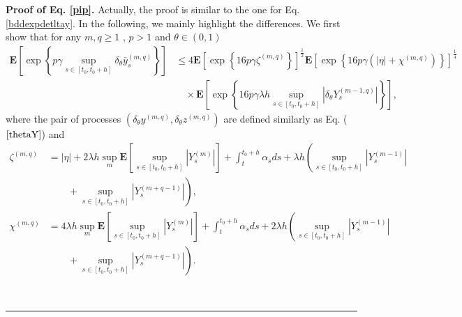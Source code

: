 \documentclass[10pt]{article}%
\numberwithin{equation}{section}
\newenvironment{proof}[1][Proof]{\noindent \textbf{#1.} }{\  \rule{0.5em}{0.5em}}
\begin{document}
\begin{proof}[Proof of Eq. \eqref{pip}]
 Actually, the proof is similar to the one for Eq. \eqref{bddexpdetltay}. In the following, we mainly highlight the differences. We first show that for any $m,q \geq 1$ , $p>1$ and $\theta\in\left(0,1\right)$
$$
\begin{aligned}
\mathbf{E} \left[\exp\left\{p\gamma\sup_{s\in[t_0,t_0+h]}\delta_{\theta}\bar{y}_s^{(m,q)}\right\}\right]&\leq4\mathbf{E}\left[\exp\left\{16p\gamma\zeta^{(m, q)} \right\}\right]^{\frac{1}{2}}\mathbf{E}\left[\exp\left\{16p\gamma\left(|\eta|+\chi^{(m, q)}\right)\right\}\right]^{\frac{1}{4}}\\
&\quad \times \mathbf{E}\left[\exp\left\{16p\gamma\lambda h\sup _{s \in[t_0, t_0+h]}\left|\delta_\theta Y_s^{(m-1, q)}\right|\right\}\right],   
\end{aligned}
$$
where the pair of processes $\left(\delta_\theta y^{(m, q)}, \delta_\theta z^{(m, q)}\right)$ are defined similarly as Eq. ($\ref{thetaY}$) and
$$
\begin{aligned}
	\zeta^{(m, q)} & =|\eta|+2\lambda h  \sup_m \mathbf{E}\left[\sup _{s \in[t_0, t_0+h]}\left|Y_s^{(m)}\right|\right]+\int_t^{t_0+h} \alpha_s d s+\lambda h\left(\sup _{s \in[t_0, t_0+h]}\left|Y_s^{(m-1)}\right|\right.\\
  &\left.\qquad+\sup _{s \in[t_0, t_0+h]}\left|Y_s^{(m+q-1)}\right|\right), \\
	\chi^{(m, q)} & =4 \lambda h\sup_m \mathbf{E}\left[\sup _{s \in[t_0, t_0+h]}\left|Y_s^{(m)}\right|\right] +\int_t^{t_0+h} \alpha_s d s+2 \lambda h\left(\sup _{s \in[t_0, t_0+h]}\left|Y_s^{(m-1)}\right|\right.\\
 &\left.\qquad+\sup _{s \in[t_0, t_0+h]}\left|Y_s^{(m+q-1)}\right|\right).
 \end{aligned}
 $$


\end{proof}
\end{document}
